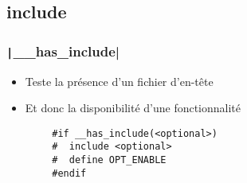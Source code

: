 \documentclass[C++.tex]{subfiles}
\begin{document}
\subsection*{include}
\begin{frame}[fragile]
	\frametitle{\texttt|__has_include|}
	\begin{itemize}
		\item Teste la présence d'un fichier d'en-tête
		\item Et donc la disponibilité d'une fonctionnalité
	\end{itemize}

	\begin{verbatim}
		#if __has_include(<optional>)
		#  include <optional>
		#  define OPT_ENABLE
		#endif
	\end{verbatim}


\end{frame}
\end{document}
